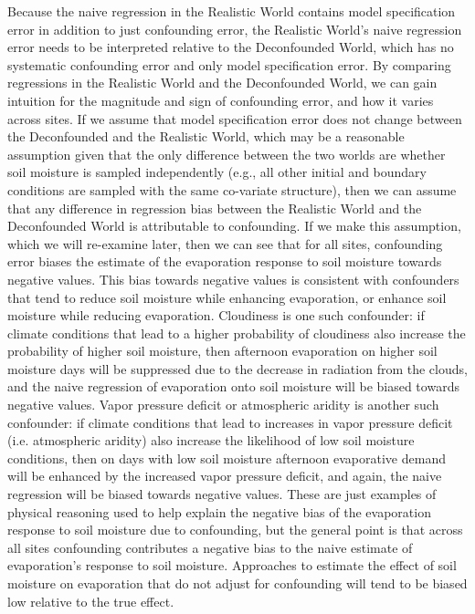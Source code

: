 \documentclass[12pt]{article}
\begin{document}
Because the naive regression in the Realistic World contains model
specification error in addition to just confounding error, the
Realistic World's naive regression error needs to be interpreted
relative to the Deconfounded World, which has no systematic
confounding error and only model specification error. By comparing
regressions in the Realistic World and the Deconfounded World, we can
gain intuition for the magnitude and sign of confounding error, and
how it varies across sites. If we assume that model specification
error does not change between the Deconfounded and the Realistic
World, which may be a reasonable assumption given that the only
difference between the two worlds are whether soil moisture is sampled
independently (e.g., all other initial and boundary conditions are
sampled with the same co-variate structure), then we can assume that
any difference in regression bias between the Realistic World and the
Deconfounded World is attributable to confounding. If we make this
assumption, which we will re-examine later, then we can see that for
all sites, confounding error biases the estimate of the evaporation
response to soil moisture towards negative values. This bias towards
negative values is consistent with confounders that tend to reduce
soil moisture while enhancing evaporation, or enhance soil moisture
while reducing evaporation. Cloudiness is one such confounder: if
climate conditions that lead to a higher probability of cloudiness
also increase the probability of higher soil moisture, then afternoon
evaporation on higher soil moisture days will be suppressed due to the
decrease in radiation from the clouds, and the naive regression of
evaporation onto soil moisture will be biased towards negative
values. Vapor pressure deficit or atmospheric aridity is another such
confounder: if climate conditions that lead to increases in vapor
pressure deficit (i.e. atmospheric aridity) also increase the
likelihood of low soil moisture conditions, then on days with low soil
moisture afternoon evaporative demand will be enhanced by the
increased vapor pressure deficit, and again, the naive regression will
be biased towards negative values. These are just examples of physical
reasoning used to help explain the negative bias of the evaporation
response to soil moisture due to confounding, but the general point is
that across all sites confounding contributes a negative bias to the
naive estimate of evaporation's response to soil moisture. Approaches
to estimate the effect of soil moisture on evaporation that do not
adjust for confounding will tend to be biased low relative to the true
effect.
\end{document}
